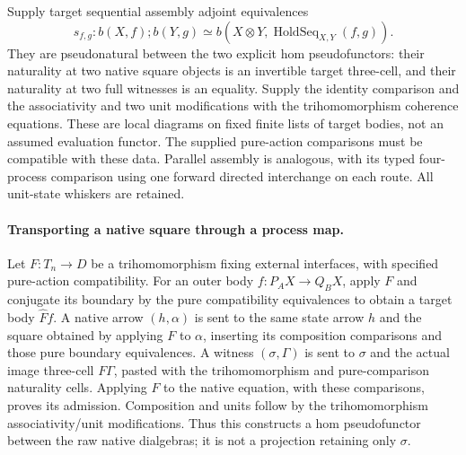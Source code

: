 \documentclass{article}
\begin{document}
Supply target sequential assembly adjoint equivalences
\[
 s_{f,g}:b(X,f);b(Y,g)\simeq
 b(X\otimes Y,\operatorname{HoldSeq}_{X,Y}(f,g)).
\]
They are pseudonatural between the two explicit hom pseudofunctors: their naturality at two native square objects is an invertible target three-cell, and their naturality at two full witnesses is an equality. Supply the identity comparison and the associativity and two unit modifications with the trihomomorphism coherence equations. These are local diagrams on fixed finite lists of target bodies, not an assumed evaluation functor. The supplied pure-action comparisons must be compatible with these data. Parallel assembly is analogous, with its typed four-process comparison using one forward directed interchange on each route. All unit-state whiskers are retained.

\paragraph{Transporting a native square through a process map.} Let $F:T_n\to D$ be a trihomomorphism fixing external interfaces, with specified pure-action compatibility. For an outer body $f:P_AX\to Q_BX$, apply $F$ and conjugate its boundary by the pure compatibility equivalences to obtain a target body $\widehat Ff$. A native arrow $(h,\alpha)$ is sent to the same state arrow $h$ and the square obtained by applying $F$ to $\alpha$, inserting its composition comparisons and those pure boundary equivalences. A witness $(\sigma,\Gamma)$ is sent to $\sigma$ and the actual image three-cell $F\Gamma$, pasted with the trihomomorphism and pure-comparison naturality cells. Applying $F$ to the native equation, with these comparisons, proves its admission. Composition and units follow by the trihomomorphism associativity/unit modifications. Thus this constructs a hom pseudofunctor between the raw native dialgebras; it is not a projection retaining only $\sigma$.
\end{document}
